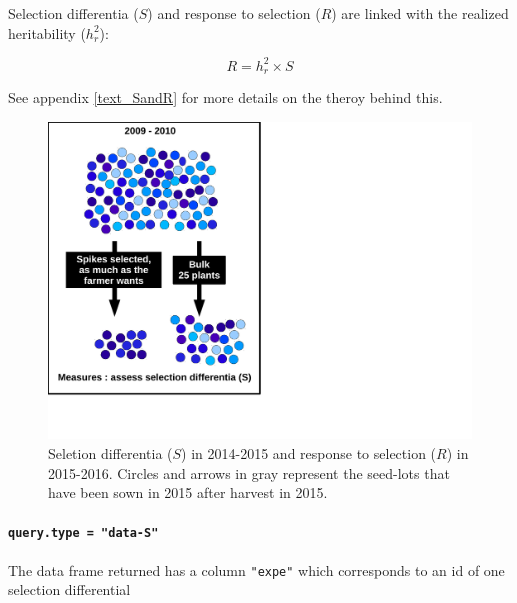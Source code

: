 \documentclass{article}\usepackage[]{graphicx}\usepackage[]{color}
\begin{document}
Selection differentia ($S$) and response to selection ($R$) are linked with the realized heritability ($h_{r}^2$):

\begin{displaymath}
R = h_{r}^2 \times S
\end{displaymath}

See appendix \ref{text_SandR} for more details on the theroy behind this.

\begin{figure}[H]
\begin{center}
\includegraphics[page=8, width=.8\textwidth]{SandR_EN.pdf}
\caption{Seletion differentia ($S$) in 2014-2015 and response to selection ($R$) in 2015-2016. Circles and arrows in gray represent the seed-lots that have been sown in 2015 after harvest in 2015.}
\label{SandR}
\end{center}
\end{figure}



\paragraph{\texttt{query.type = "data-S"}}

The data frame returned has a column \texttt{"expe"} which corresponds to an id of one selection differential
\end{document}
